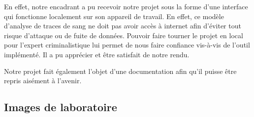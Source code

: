 \documentclass[a4paper]{article}
\begin{document}
En effet, notre encadrant a pu recevoir notre projet sous la forme d'une interface qui fonctionne localement sur son appareil de travail. En effet, ce modèle d'analyse de traces de sang ne doit pas avoir accès à internet afin d'éviter tout risque d'attaque ou de fuite de données. Pouvoir faire tourner le projet en local pour l'expert criminalistique lui permet de nous faire confiance vis-à-vis de l'outil implémenté. Il a pu apprécier et être satisfait de notre rendu.

Notre projet fait également l'objet d'une documentation afin qu'il puisse être repris aisément à l'avenir. 

\printbibliography

\begin{appendices}

\section{Images de laboratoire}
\label{sec: annexe}


\end{appendices}
\end{document}
